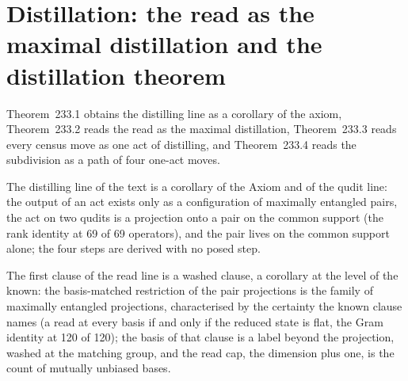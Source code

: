 \section{Distillation: the read as the maximal distillation and the distillation theorem}\label{mod:XIII-4-distillation-the-read-as-the-maximal-distillation-and-the-distillation-theorem}
\label{narr:open:13-4}Theorem~233.1 obtains the distilling line as a corollary of the axiom, Theorem~233.2 reads the read as the maximal distillation, Theorem~233.3 reads every census move as one act of distilling, and Theorem~233.4 reads the subdivision as a path of four one-act moves.
\begin{chtheorem}\label{box:XIII-4-distillation-the-read-as-the-maximal-distillation-and-the-distillation-theorem:1}
The distilling line of the text is a corollary of the Axiom and of the qudit line: the output of an act exists only as a configuration of maximally entangled pairs, the act on two qudits is a projection onto a pair on the common support (the rank identity at 69 of 69 operators), and the pair lives on the common support alone; the four steps are derived with no posed step.
\end{chtheorem}
\begin{chtheorem}\label{box:XIII-4-distillation-the-read-as-the-maximal-distillation-and-the-distillation-theorem:2}
The first clause of the read line is a washed clause, a corollary at the level of the known: the basis-matched restriction of the pair projections is the family of maximally entangled projections, characterised by the certainty the known clause names (a read at every basis if and only if the reduced state is flat, the Gram identity at 120 of 120); the basis of that clause is a label beyond the projection, washed at the matching group, and the read cap, the dimension plus one, is the count of mutually unbiased bases.
\end{chtheorem}
